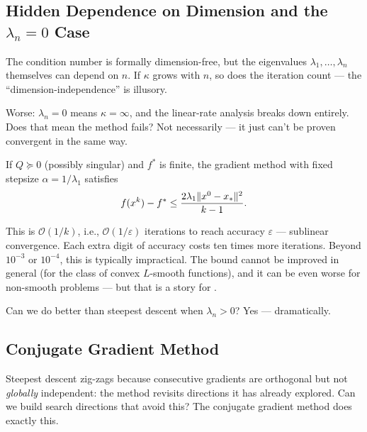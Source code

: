 \subsection{Hidden Dependence on Dimension and the \texorpdfstring{$\lambda_n = 0$}{λₙ = 0} Case}\label{ssec:lambda-n-zero}

The condition number is formally dimension-free, but the eigenvalues $\lambda_1, \dots, \lambda_n$ themselves can depend on $n$.
If $\kappa$ grows with $n$, so does the iteration count --- the ``dimension-independence'' is illusory.

Worse: $\lambda_n = 0$ means $\kappa = \infty$, and the linear-rate analysis breaks down entirely.
Does that mean the method fails?
Not necessarily --- it just can't be proven convergent in the same way.

\begin{thm}[Sublinear convergence for $\lambda_n = 0$]\label{thm:sublinear-quad}
	If $Q \succeq 0$ (possibly singular) and $f^*$ is finite, the gradient method with fixed stepsize $\alpha = 1/\lambda_1$ satisfies \cite{bubeck2015}
	\begin{equation}\label{eq:sublinear-quad}
		f(x^k) - f^* \leq \frac{2 \lambda_1 \lVert x^0 - x_*\rVert^2}{k - 1}.
	\end{equation}
\end{thm}

This is $\mathcal{O}(1/k)$, i.e., $\mathcal{O}(1/\varepsilon)$ iterations to reach accuracy $\varepsilon$ --- sublinear convergence.
Each extra digit of accuracy costs ten times more iterations.
Beyond $10^{-3}$ or $10^{-4}$, this is typically impractical.
The bound cannot be improved in general (for the class of convex $L$-smooth functions), and it can be even worse for non-smooth problems --- but that is a story for .

Can we do better than steepest descent when $\lambda_n > 0$?
Yes --- dramatically.


\subsection{Conjugate Gradient Method}\label{ssec:conjugate-gradient}

Steepest descent zig-zags because consecutive gradients are orthogonal but not \textit{globally} independent: the method revisits directions it has already explored.
Can we build search directions that avoid this?
The conjugate gradient method does exactly this.

